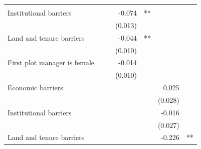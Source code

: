 \begin{table}[!h]
\begin{tabular}{lllllll}
  \multicolumn{1}{l}{} \\
\multicolumn{1}{l}{Institutional barriers} &
  \multicolumn{1}{r}{} &
  \multicolumn{1}{l}{} &
  \multicolumn{1}{r}{-0.074} &
  \multicolumn{1}{l}{**} &
  \multicolumn{1}{r}{} &
  \multicolumn{1}{l}{} \\
\multicolumn{1}{l}{} &
  \multicolumn{1}{r}{} &
  \multicolumn{1}{l}{} &
  \multicolumn{1}{r}{(0.013)} &
  \multicolumn{1}{l}{} &
  \multicolumn{1}{r}{} &
  \multicolumn{1}{l}{} \\
\multicolumn{1}{l}{Land and tenure barriers} &
  \multicolumn{1}{r}{} &
  \multicolumn{1}{l}{} &
  \multicolumn{1}{r}{-0.044} &
  \multicolumn{1}{l}{**} &
  \multicolumn{1}{r}{} &
  \multicolumn{1}{l}{} \\
\multicolumn{1}{l}{} &
  \multicolumn{1}{r}{} &
  \multicolumn{1}{l}{} &
  \multicolumn{1}{r}{(0.010)} &
  \multicolumn{1}{l}{} &
  \multicolumn{1}{r}{} &
  \multicolumn{1}{l}{} \\
\multicolumn{1}{l}{First plot manager is female} &
  \multicolumn{1}{r}{} &
  \multicolumn{1}{l}{} &
  \multicolumn{1}{r}{-0.014} &
  \multicolumn{1}{l}{} &
  \multicolumn{1}{r}{} &
  \multicolumn{1}{l}{} \\
\multicolumn{1}{l}{} &
  \multicolumn{1}{r}{} &
  \multicolumn{1}{l}{} &
  \multicolumn{1}{r}{(0.010)} &
  \multicolumn{1}{l}{} &
  \multicolumn{1}{r}{} &
  \multicolumn{1}{l}{} \\
\multicolumn{1}{l}{Economic barriers} &
  \multicolumn{1}{r}{} &
  \multicolumn{1}{l}{} &
  \multicolumn{1}{r}{} &
  \multicolumn{1}{l}{} &
  \multicolumn{1}{r}{0.025} &
  \multicolumn{1}{l}{} \\
\multicolumn{1}{l}{} &
  \multicolumn{1}{r}{} &
  \multicolumn{1}{l}{} &
  \multicolumn{1}{r}{} &
  \multicolumn{1}{l}{} &
  \multicolumn{1}{r}{(0.028)} &
  \multicolumn{1}{l}{} \\
\multicolumn{1}{l}{Institutional barriers} &
  \multicolumn{1}{r}{} &
  \multicolumn{1}{l}{} &
  \multicolumn{1}{r}{} &
  \multicolumn{1}{l}{} &
  \multicolumn{1}{r}{-0.016} &
  \multicolumn{1}{l}{} \\
\multicolumn{1}{l}{} &
  \multicolumn{1}{r}{} &
  \multicolumn{1}{l}{} &
  \multicolumn{1}{r}{} &
  \multicolumn{1}{l}{} &
  \multicolumn{1}{r}{(0.027)} &
  \multicolumn{1}{l}{} \\
\multicolumn{1}{l}{Land and tenure barriers} &
  \multicolumn{1}{r}{} &
  \multicolumn{1}{l}{} &
  \multicolumn{1}{r}{} &
  \multicolumn{1}{l}{} &
  \multicolumn{1}{r}{-0.226} &
  \multicolumn{1}{l}{**} \\

\end{tabular}
\end{table}

